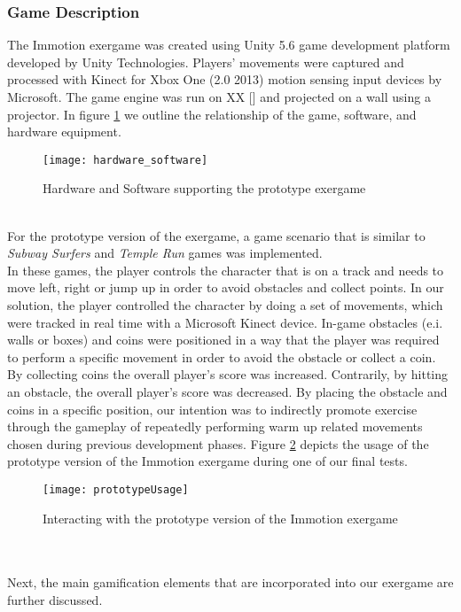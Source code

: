 \subsubsection{Game Description}
The Immotion exergame was created using Unity 5.6 game development platform developed by Unity Technologies. Players' movements were captured and processed with Kinect for Xbox One (2.0 2013) motion sensing input devices by Microsoft. The game engine was run on XX [] and projected on a wall using a projector. In figure \ref{fig:hs} we outline the relationship of the game, software, and hardware equipment.\\
\begin{figure}[h]
    \centering
    \texttt{[image: hardware\_software]}
    \caption{Hardware and Software supporting the prototype exergame}
    \label{fig:hs}
\end{figure}\\
For the prototype version of the exergame, a game scenario that is similar to \textit{Subway Surfers} and \textit{Temple Run} games was implemented. \\In these games, the player controls the character that is on a track and needs to move left, right or jump up in order to avoid obstacles and collect points. In our solution, the player controlled the character by doing a set of movements, which were tracked in real time with a Microsoft Kinect device. In-game obstacles (e.i. walls or boxes) and coins were positioned in a way that the player was required to perform a specific movement in order to avoid the obstacle or collect a coin. By collecting coins the overall player's score was increased. Contrarily, by hitting an obstacle, the overall player's score was decreased. By placing the obstacle and coins in a specific position, our intention was to indirectly promote exercise through the gameplay of repeatedly performing warm up related movements chosen during previous development phases. Figure \ref{fig:prototypeUsage} depicts the usage of the prototype version of the Immotion exergame during one of our final tests.
\begin{figure}[h]
    \centering
    \texttt{[image: prototypeUsage]}
    \caption{Interacting with the prototype version of the Immotion exergame}
    \label{fig:prototypeUsage}
\end{figure}\\ \\
Next, the main gamification elements that are incorporated into our exergame are further discussed.
